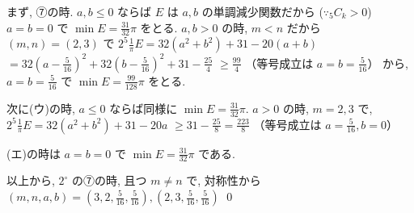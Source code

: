 \documentclass[../main.tex]{subfiles}
\begin{document}
まず, ⑦の時. $a, b \le 0$ ならば $E$ は $a, b$ の単調減少関数だから ($\because {}_5C_k > 0$)
$a=b=0$ で $\min E = \frac{31}{32}\pi$ をとる. $a, b > 0$ の時, $m < n$ だから $(m,n) = (2,3)$ で
$2^5 \frac{1}{\pi} E = 32(a^2+b^2) + 31 - 20(a+b)$
$= 32\left(a - \frac{5}{16}\right)^2 + 32\left(b - \frac{5}{16}\right)^2 + 31 - \frac{25}{4}$
$\ge \frac{99}{4}$ （等号成立は $a=b=\frac{5}{16}$）
から, $a=b=\frac{5}{16}$ で $\min E = \frac{99}{128}\pi$ をとる.

次に(ウ)の時, $a \le 0$ ならば同様に $\min E = \frac{31}{32}\pi$. $a > 0$ の時, $m=2, 3$ で,
$2^5 \frac{1}{\pi} E = 32(a^2+b^2) + 31 - 20a$
$\ge 31 - \frac{25}{8} = \frac{223}{8}$ （等号成立は $a=\frac{5}{16}, b=0$）

(エ)の時は $a=b=0$ で $\min E = \frac{31}{32}\pi$ である.

以上から, $2^\circ$ の⑦の時, 且つ $m \neq n$ で, 対称性から
$(m,n,a,b) = \left(3, 2, \frac{5}{16}, \frac{5}{16}\right), \left(2, 3, \frac{5}{16}, \frac{5}{16}\right)$ \qed
\end{document}
